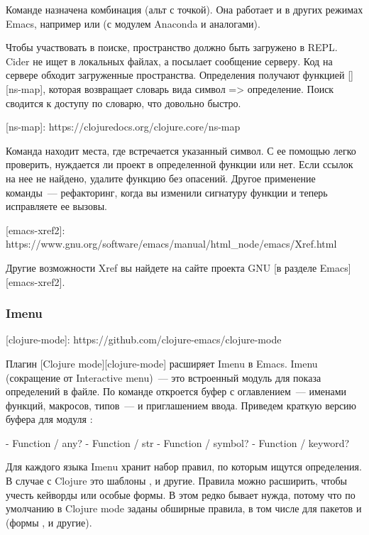 Команде  назначена комбинация  (альт с точкой). Она работает и в других режимах Emacs, например  или  (с модулем Anaconda и аналогами).

Чтобы участвовать в поиске, пространство должно быть загружено в REPL. Cider не ищет в локальных файлах, а посылает сообщение серверу. Код на сервере обходит загруженные пространства. Определения получают функцией [][ns-map], которая возвращает словарь вида символ => определение. Поиск сводится к доступу по словарю, что довольно быстро.

[ns-map]: https://clojuredocs.org/clojure.core/ns-map

Команда  находит места, где встречается указанный символ. С ее помощью легко проверить, нуждается ли проект в определенной функции или нет. Если ссылок на нее не найдено, удалите функцию без опасений. Другое применение команды~--- рефакторинг, когда вы изменили сигнатуру функции и теперь исправляете ее вызовы.

[emacs-xref2]: https://www.gnu.org/software/emacs/manual/html\_node/emacs/Xref.html

Другие возможности Xref вы найдете на сайте проекта GNU [в разделе Emacs][emacs-xref2].

\subsubsection{Imenu}

[clojure-mode]: https://github.com/clojure-emacs/clojure-mode

Плагин [Clojure mode][clojure-mode] расширяет Imenu в Emacs. Imenu (сокращение от Interactive menu)~--- это встроенный модуль для показа определений в файле. По команде  откроется буфер с оглавлением~--- именами функций, макросов, типов~--- и приглашением ввода. Приведем краткую версию буфера для модуля :

\begin{english}
  \begin{text}
- Function / any?
- Function / str
- Function / symbol?
- Function / keyword?
  \end{text}
\end{english}

Для каждого языка Imenu хранит набор правил, по которым ищутся определения. В случае с Clojure это шаблоны ,  и другие. Правила можно расширить, чтобы учесть кейворды или особые формы. В этом редко бывает нужда, потому что по умолчанию в Clojure mode заданы обширные правила, в том числе для пакетов  и  (формы ,  и другие).

